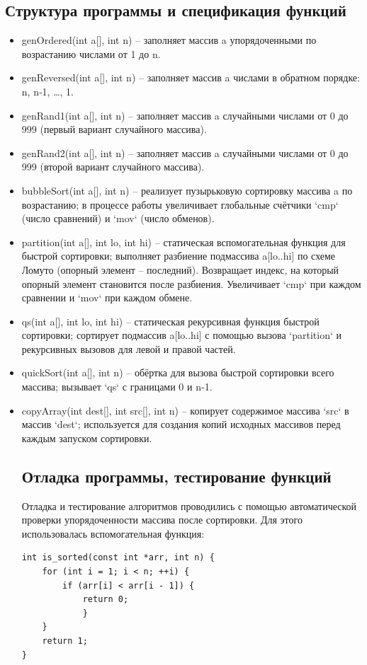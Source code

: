 \documentclass[a4paper,12pt,titlepage,finall]{article}
\begin{document}
\begin{itemize}
\newpage

\section{Структура программы и спецификация функций}
\begin{itemize}
\item genOrdered(int a[], int n) – заполняет массив a упорядоченными по возрастанию числами от 1 до n.
\item genReversed(int a[], int n) – заполняет массив a числами в обратном порядке: n, n‑1, …, 1.
\item genRand1(int a[], int n) – заполняет массив a случайными числами от 0 до 999 (первый вариант случайного массива).
\item genRand2(int a[], int n) – заполняет массив a случайными числами от 0 до 999 (второй вариант случайного массива).
\item bubbleSort(int a[], int n) – реализует пузырьковую сортировку массива a по возрастанию; в процессе работы увеличивает глобальные счётчики `cmp` (число сравнений) и `mov` (число обменов).
\item partition(int a[], int lo, int hi) – статическая вспомогательная функция для быстрой сортировки; выполняет разбиение подмассива a[lo..hi] по схеме Ломуто (опорный элемент – последний). Возвращает индекс, на который опорный элемент становится после разбиения. Увеличивает `cmp` при каждом сравнении и `mov` при каждом обмене.
\item qs(int a[], int lo, int hi) – статическая рекурсивная функция быстрой сортировки; сортирует подмассив a[lo..hi] с помощью вызова `partition` и рекурсивных вызовов для левой и правой частей.
\item quickSort(int a[], int n) – обёртка для вызова быстрой сортировки всего массива; вызывает `qs` с границами 0 и n‑1.
\item copyArray(int dest[], int src[], int n) – копирует содержимое массива `src` в массив `dest`; используется для создания копий исходных массивов перед каждым запуском сортировки.

\newpage

\section{Отладка программы, тестирование функций}

Отладка и тестирование алгоритмов проводились с помощью автоматической проверки упорядоченности массива после сортировки. Для этого использовалась вспомогательная функция:
\begin{verbatim}
int is_sorted(const int *arr, int n) {
    for (int i = 1; i < n; ++i) {
        if (arr[i] < arr[i - 1]) {
            return 0;
            }
    }
    return 1;
}
\end{verbatim}


\end{itemize}
\end{itemize}
\end{document}
